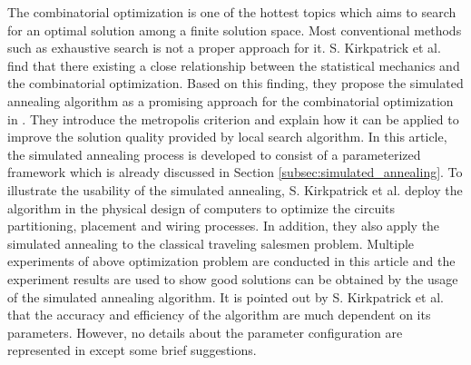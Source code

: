 \label{chap:related_work}
The combinatorial optimization is one of the hottest topics which
aims to search for an optimal solution among a finite solution space.
Most conventional methods such as exhaustive search is not a proper
approach for it.
S. Kirkpatrick et al. find that there existing a close relationship
between the statistical mechanics and the combinatorial optimization.
Based on this finding, they propose the simulated annealing algorithm
as a promising approach for the combinatorial optimization in
\cite{10.2307/1690046}.
They introduce the metropolis criterion and explain how it can be
applied to improve the solution quality provided by local search
algorithm. In this article, the simulated annealing process is
developed to consist of a parameterized framework which is already
discussed in Section \ref{subsec:simulated_annealing}. To illustrate
the usability of the simulated annealing, S. Kirkpatrick et al. deploy
the algorithm in the physical design of computers to optimize the
circuits partitioning, placement and wiring processes.
In addition, they also apply the simulated annealing to the classical
traveling salesmen problem. Multiple experiments of above optimization
problem are conducted in this article and the experiment results are
used to show good solutions can be obtained by the usage of the
simulated annealing algorithm. It is pointed out by S. Kirkpatrick et al.
that the accuracy and efficiency of the algorithm are much dependent on
its parameters. However, no details about the parameter configuration are
represented in \cite{10.2307/1690046} except some brief suggestions.